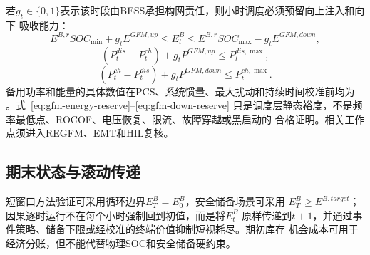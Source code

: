 若$g_t\in\{0,1\}$表示该时段由BESS承担构网责任，则小时调度必须预留向上注入和向下
吸收能力：
\begin{equation}
E^{B,r}SOC_{\min}+g_tE^{GFM,up}
\le E_t^B\le
E^{B,r}SOC_{\max}-g_tE^{GFM,down},
\label{eq:gfm-energy-reserve}
\end{equation}
\begin{equation}
(P_t^{dis}-P_t^{ch})+g_tP^{GFM,up}\le P_t^{dis,\max},
\label{eq:gfm-up-reserve}
\end{equation}
\begin{equation}
(P_t^{ch}-P_t^{dis})+g_tP^{GFM,down}\le P_t^{ch,\max}.
\label{eq:gfm-down-reserve}
\end{equation}
备用功率和能量的具体数值在PCS、系统惯量、最大扰动和持续时间校准前均为
\assumptiontag。式~\eqref{eq:gfm-energy-reserve}--\eqref{eq:gfm-down-reserve}
只是调度层静态裕度，不是频率最低点、ROCOF、电压恢复、限流、故障穿越或黑启动的
合格证明。相关工作点须进入REGFM、EMT和HIL复核\cite{regfm-b1,unifi-v3}。

\subsection{期末状态与滚动传递}

短窗口方法验证可采用循环边界$E_T^B=E_0^B$，安全储备场景可采用
$E_T^B\ge E^{B,target}$；因果逐时运行不在每个小时强制回到初值，而是将$E_t^B$
原样传递到$t+1$，并通过事件策略、储备下限或经校准的终端价值抑制短视耗尽。期初库存
机会成本可用于经济分账，但不能代替物理SOC和安全储备硬约束。
